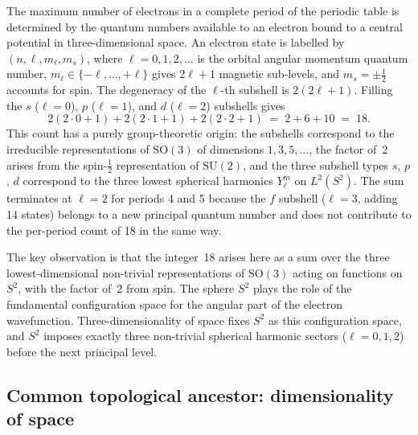 \documentclass[11pt,a4paper]{article}
\theoremstyle{definition}
\begin{document}
The maximum number of electrons in a complete period of the periodic table is determined by the quantum numbers available to an electron bound to a central potential in three-dimensional space. An electron state is labelled by $(n, \ell, m_\ell, m_s)$, where $\ell = 0, 1, 2, \ldots$ is the orbital angular momentum quantum number, $m_\ell \in \{-\ell, \ldots, +\ell\}$ gives $2\ell+1$ magnetic sub-levels, and $m_s = \pm\tfrac{1}{2}$ accounts for spin. The degeneracy of the $\ell$-th subshell is $2(2\ell+1)$. Filling the $s$ ($\ell=0$), $p$ ($\ell=1$), and $d$ ($\ell=2$) subshells gives
\[
  2(2 \cdot 0 + 1) + 2(2 \cdot 1 + 1) + 2(2 \cdot 2 + 1) \;=\; 2 + 6 + 10 \;=\; 18.
\]
This count has a purely group-theoretic origin: the subshells correspond to the irreducible representations of $\mathrm{SO}(3)$ of dimensions $1, 3, 5, \ldots$, the factor of~2 arises from the spin-$\tfrac{1}{2}$ representation of $\mathrm{SU}(2)$, and the three subshell types $s$, $p$, $d$ correspond to the three lowest spherical harmonics $Y_\ell^m$ on $L^2(S^2)$.\cite{Fulton_Harris_1991,Sakurai_Napolitano_2017} The sum terminates at $\ell = 2$ for periods 4 and 5 because the $f$ subshell ($\ell = 3$, adding 14 states) belongs to a new principal quantum number and does not contribute to the per-period count of 18 in the same way.

The key observation is that the integer~18 arises here as a sum over the three lowest-dimensional non-trivial representations of $\mathrm{SO}(3)$ acting on functions on $S^2$, with the factor of~2 from spin. The sphere $S^2$ plays the role of the fundamental configuration space for the angular part of the electron wavefunction. Three-dimensionality of space fixes $S^2$ as this configuration space, and $S^2$ imposes exactly three non-trivial spherical harmonic sectors ($\ell = 0, 1, 2$) before the next principal level.

\subsection{Common topological ancestor: dimensionality of space}
\label{subsec:ancestor}
\end{document}
